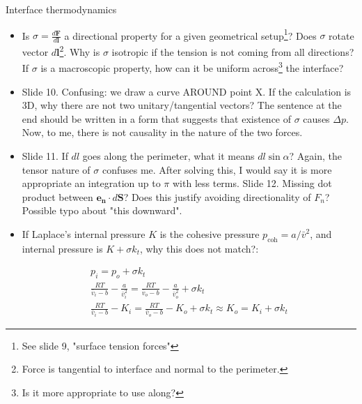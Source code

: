 \documentclass[8pt]{beamer}
\begin{document}
	
	\begin{frame}{Interface thermodynamics}
		\begin{itemize}
			\item Is $\sigma = \frac{d \mathbf{F}}{d \mathbf{l}}$ a directional property for a given geometrical setup\footnote{See slide 9, "surface tension forces"}? Does $\sigma$ rotate vector $d \mathbf{l}$\footnote{Force is tangential to interface and normal to the perimeter.}. Why is $\sigma$ isotropic if the tension is not coming from all directions? If $\sigma$ is a macroscopic property, how can it be uniform across\footnote{Is it more appropriate to use along?} the interface?
			
			\item Slide 10. Confusing: we draw a curve AROUND point X. If the calculation is 3D, why there are not two unitary/tangential vectors? The sentence at the end should be written in a form that suggests that existence of $\sigma$ causes $\Delta p$. Now, to me, there is not causality in the nature of the two forces.
			
			\item Slide 11. If $dl$ goes along the perimeter, what it means $dl \sin \alpha$? Again, the tensor nature of $\sigma$ confuses me. After solving this, I would say it is more appropriate an integration up to $\pi$ with less terms. Slide 12. Missing dot product between $\mathbf{e_n} \cdot d\mathbf{S}$? Does this justify avoiding directionality of $F_n$? Possible typo about "this downward". 
			
			\item If Laplace's internal pressure $K$ is the cohesive pressure $p_\text{coh} = a/\bar{v}^2$, and internal pressure is $K + \sigma k_t$, why this does not match?:
			
			\begin{equation*}
				\begin{split}
				p_i = p_o + \sigma k_t\\
				\frac{RT}{\bar{v}_i-b} - \frac{a}{\bar{v}_i^2} = \frac{RT}{\bar{v}_o-b} - \frac{a}{\bar{v}_o^2} + \sigma k_t\\
				\frac{RT}{\bar{v}_i-b} - K_i = \frac{RT}{\bar{v}_o-b} - K_o + \sigma k_t  \approx K_o = K_i + \sigma k_t
				\end{split}
			\end{equation*}
		\end{itemize}
	\end{frame}
	
\end{document}
